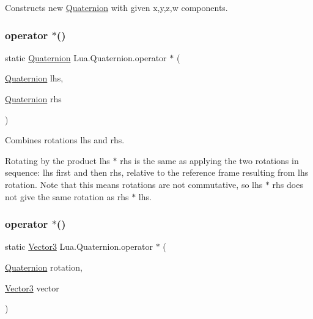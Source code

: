 Constructs new \mbox{\hyperlink{class_lua_1_1_quaternion}{Quaternion}} with given x,y,z,w components. 

\mbox{\label{class_lua_1_1_quaternion_af6d179e922217cf36197ed89c6cff2a4}} 
\subsubsection{\texorpdfstring{operator $\ast$()}{operator *()}\hspace{0.1cm}{\footnotesize\ttfamily [1/2]}}
{\footnotesize\ttfamily static \mbox{\hyperlink{class_lua_1_1_quaternion}{Quaternion}} Lua.\+Quaternion.\+operator $\ast$ (\begin{DoxyParamCaption}\item[{\mbox{\hyperlink{class_lua_1_1_quaternion}{Quaternion}}}]{lhs,  }\item[{\mbox{\hyperlink{class_lua_1_1_quaternion}{Quaternion}}}]{rhs }\end{DoxyParamCaption})\hspace{0.3cm}{\ttfamily [static]}}



Combines rotations lhs and rhs. 

Rotating by the product {\ttfamily lhs $\ast$ rhs} is the same as applying the two rotations in sequence\+: {\ttfamily lhs} first and then {\ttfamily rhs}, relative to the reference frame resulting from {\ttfamily lhs} rotation. Note that this means rotations are not commutative, so {\ttfamily lhs $\ast$ rhs} does not give the same rotation as {\ttfamily rhs $\ast$ lhs}. \mbox{\label{class_lua_1_1_quaternion_a7a0f65d72a342ca595d8a3a7f53b0892}} 
\subsubsection{\texorpdfstring{operator $\ast$()}{operator *()}\hspace{0.1cm}{\footnotesize\ttfamily [2/2]}}
{\footnotesize\ttfamily static \mbox{\hyperlink{class_lua_1_1_vector3}{Vector3}} Lua.\+Quaternion.\+operator $\ast$ (\begin{DoxyParamCaption}\item[{\mbox{\hyperlink{class_lua_1_1_quaternion}{Quaternion}}}]{rotation,  }\item[{\mbox{\hyperlink{class_lua_1_1_vector3}{Vector3}}}]{vector }\end{DoxyParamCaption})\hspace{0.3cm}{\ttfamily [static]}}



